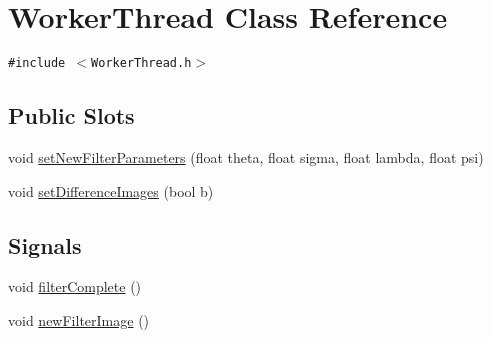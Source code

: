 \hypertarget{classWorkerThread}{
\section{WorkerThread Class Reference}
\label{classWorkerThread}
}
{\tt \#include $<$WorkerThread.h$>$}

\subsection*{Public Slots}
\begin{CompactItemize}
\item 
void \hyperlink{classWorkerThread_e8e56694aa4f03dfef4c206269f7ef8d}{setNewFilterParameters} (float theta, float sigma, float lambda, float psi)
\item 
void \hyperlink{classWorkerThread_123b802c534d8e624f49cac6a94933d7}{setDifferenceImages} (bool b)
\end{CompactItemize}
\subsection*{Signals}
\begin{CompactItemize}
\item 
void \hyperlink{classWorkerThread_ea7496b585a29398a3c5a490fb3bf9c6}{filterComplete} ()
\item 
void \hyperlink{classWorkerThread_beca512642668fb06773f60abc56ca32}{newFilterImage} ()
\end{CompactItemize}
